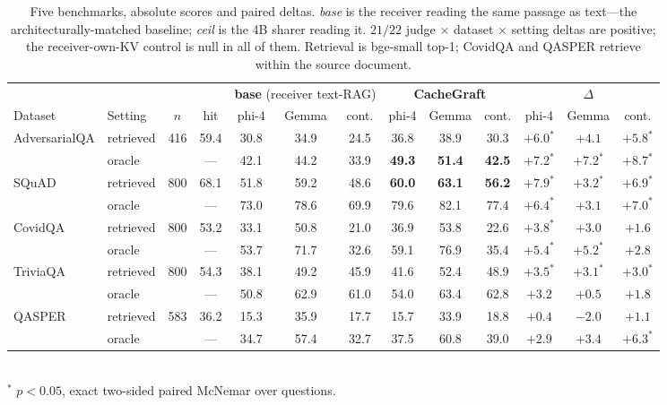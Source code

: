 \documentclass[sigconf,anonymous,review]{acmart}
\newcommand{\sys}{CacheGraft}
\newcommand{\best}[1]{\textbf{#1}}
\begin{document}
\begin{table}[t]
\centering\small
\caption{Five benchmarks, absolute scores and paired deltas. \emph{base} is the receiver reading
the same passage as text---the architecturally-matched baseline; \emph{ceil} is the 4B sharer
reading it. $21/22$ judge $\times$ dataset $\times$ setting deltas are positive; the
receiver-own-KV control is null in all of them. Retrieval is bge-small top-1; CovidQA and QASPER
retrieve within the source document.}
\label{tab:cross}
\begin{tabular}{llcc ccc ccc ccc}
\toprule
& & & & \multicolumn{3}{c}{\textbf{base} (receiver text-RAG)} & \multicolumn{3}{c}{\textbf{\sys{}}}
& \multicolumn{3}{c}{$\Delta$} \\
\cmidrule(lr){5-7}\cmidrule(lr){8-10}\cmidrule(lr){11-13}
Dataset & Setting & $n$ & hit & phi-4 & Gemma & cont. & phi-4 & Gemma & cont.
& phi-4 & Gemma & cont. \\
\midrule
\multirow{2}{*}{AdversarialQA} & retrieved & \multirow{2}{*}{416} & 59.4 & 30.8 & 34.9 & 24.5
  & 36.8 & 38.9 & 30.3 & $+6.0^{*}$ & $+4.1$ & $+5.8^{*}$ \\
 & oracle & & --- & 42.1 & 44.2 & 33.9 & \best{49.3} & \best{51.4} & \best{42.5}
 & $+7.2^{*}$ & $+7.2^{*}$ & $+8.7^{*}$ \\
\midrule
\multirow{2}{*}{SQuAD} & retrieved & \multirow{2}{*}{800} & 68.1 & 51.8 & 59.2 & 48.6
  & \best{60.0} & \best{63.1} & \best{56.2} & $+7.9^{*}$ & $+3.2^{*}$ & $+6.9^{*}$ \\
 & oracle & & --- & 73.0 & 78.6 & 69.9 & 79.6 & 82.1 & 77.4
 & $+6.4^{*}$ & $+3.1$ & $+7.0^{*}$ \\
\midrule
\multirow{2}{*}{CovidQA} & retrieved & \multirow{2}{*}{800} & 53.2 & 33.1 & 50.8 & 21.0
  & 36.9 & 53.8 & 22.6 & $+3.8^{*}$ & $+3.0$ & $+1.6$ \\
 & oracle & & --- & 53.7 & 71.7 & 32.6 & 59.1 & 76.9 & 35.4
 & $+5.4^{*}$ & $+5.2^{*}$ & $+2.8$ \\
\midrule
\multirow{2}{*}{TriviaQA} & retrieved & \multirow{2}{*}{800} & 54.3 & 38.1 & 49.2 & 45.9
  & 41.6 & 52.4 & 48.9 & $+3.5^{*}$ & $+3.1^{*}$ & $+3.0^{*}$ \\
 & oracle & & --- & 50.8 & 62.9 & 61.0 & 54.0 & 63.4 & 62.8
 & $+3.2$ & $+0.5$ & $+1.8$ \\
\midrule
\multirow{2}{*}{QASPER} & retrieved & \multirow{2}{*}{583} & 36.2 & 15.3 & 35.9 & 17.7
  & 15.7 & 33.9 & 18.8 & $+0.4$ & $-2.0$ & $+1.1$ \\
 & oracle & & --- & 34.7 & 57.4 & 32.7 & 37.5 & 60.8 & 39.0
 & $+2.9$ & $+3.4$ & $+6.3^{*}$ \\
\bottomrule
\end{tabular}\\[2pt]
\footnotesize{$^{*}$ $p<0.05$, exact two-sided paired McNemar over questions.}
\end{table}
\end{document}
